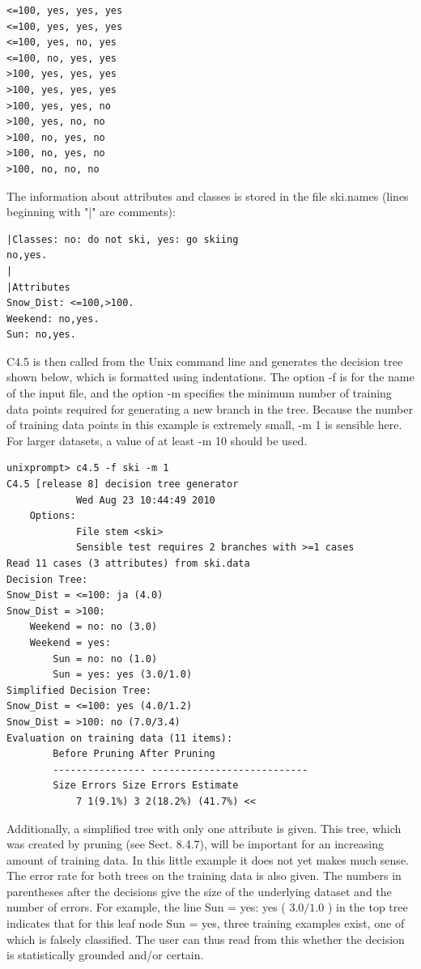 \documentclass[10pt]{book}
\begin{document}
\begin{verbatim}
<=100, yes, yes, yes
<=100, yes, yes, yes
<=100, yes, no, yes
<=100, no, yes, yes
>100, yes, yes, yes
>100, yes, yes, yes
>100, yes, yes, no
>100, yes, no, no
>100, no, yes, no
>100, no, yes, no
>100, no, no, no
\end{verbatim}

The information about attributes and classes is stored in the file ski.names (lines beginning with "|" are comments):

\begin{verbatim}
|Classes: no: do not ski, yes: go skiing
no,yes.
|
|Attributes
Snow_Dist: <=100,>100.
Weekend: no,yes.
Sun: no,yes.
\end{verbatim}

C4.5 is then called from the Unix command line and generates the decision tree shown below, which is formatted using indentations. The option -f is for the name of the input file, and the option -m specifies the minimum number of training data points required for generating a new branch in the tree. Because the number of training data points in this example is extremely small, -m 1 is sensible here. For larger datasets, a value of at least -m 10 should be used.

\begin{verbatim}
unixprompt> c4.5 -f ski -m 1
C4.5 [release 8] decision tree generator
            Wed Aug 23 10:44:49 2010
    Options:
            File stem <ski>
            Sensible test requires 2 branches with >=1 cases
Read 11 cases (3 attributes) from ski.data
Decision Tree:
Snow_Dist = <=100: ja (4.0)
Snow_Dist = >100:
    Weekend = no: no (3.0)
    Weekend = yes:
        Sun = no: no (1.0)
        Sun = yes: yes (3.0/1.0)
Simplified Decision Tree:
Snow_Dist = <=100: yes (4.0/1.2)
Snow_Dist = >100: no (7.0/3.4)
Evaluation on training data (11 items):
        Before Pruning After Pruning
        ---------------- ---------------------------
        Size Errors Size Errors Estimate
            7 1(9.1%) 3 2(18.2%) (41.7%) <<
\end{verbatim}

Additionally, a simplified tree with only one attribute is given. This tree, which was created by pruning (see Sect. 8.4.7), will be important for an increasing amount of training data. In this little example it does not yet makes much sense. The error rate for both trees on the training data is also given. The numbers in parentheses after the decisions give the size of the underlying dataset and the number of errors. For example, the line Sun = yes: yes ( $3.0 / 1.0$ ) in the top tree indicates that for this leaf node Sun = yes, three training examples exist, one of which is falsely classified. The user can thus read from this whether the decision is statistically grounded and/or certain.
\end{document}
